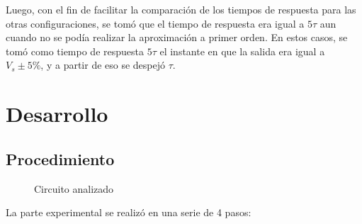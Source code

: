 \documentclass{article}
\begin{document}
\par \par Luego, con el fin de facilitar la comparación de los tiempos de respuesta para las otras configuraciones, se tomó que el tiempo de respuesta era igual a $5\tau$ aun cuando no se podía realizar la aproximación a primer orden. En estos casos, se tomó como tiempo de respuesta $5\tau$ el instante en que la salida era igual a $V_s \pm 5\% $, y a partir de eso se despejó $\tau$.


\section{Desarrollo}
    \subsection{Procedimiento}

\begin{figure}[H]
    \centering
    \caption{Circuito analizado}
    \label{fig: circuito_rlc}
\end{figure}


    La parte experimental se realizó en una serie de 4 pasos:
\end{document}
